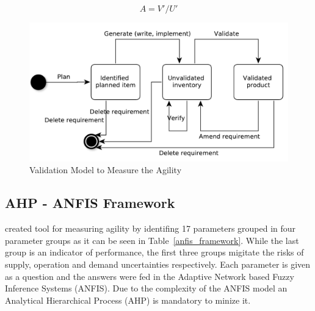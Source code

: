 \begin{equation} A = V'/U' \end{equation}

\begin{figure} [H]
\centerline{\includegraphics[scale=0.6]{include/relatedwork/fig/validation_model.pdf}}
\caption{Validation Model to Measure the Agility} 
\label{validation_model}
\end{figure}

\subsection{AHP - ANFIS Framework} %
\citet{poonacha} created tool for measuring agility by identifing 17 parameters grouped in four parameter groups as it can be seen in Table~\ref{anfis_framework}. While the last group is an indicator of performance, the first three groups migitate the risks of supply, operation and demand uncertainties respectively. Each parameter is given as a question and the answers were fed in the Adaptive Network based Fuzzy Inference Systems (ANFIS). Due to the complexity of the ANFIS model an Analytical Hierarchical Process (AHP) is mandatory to minize it.


